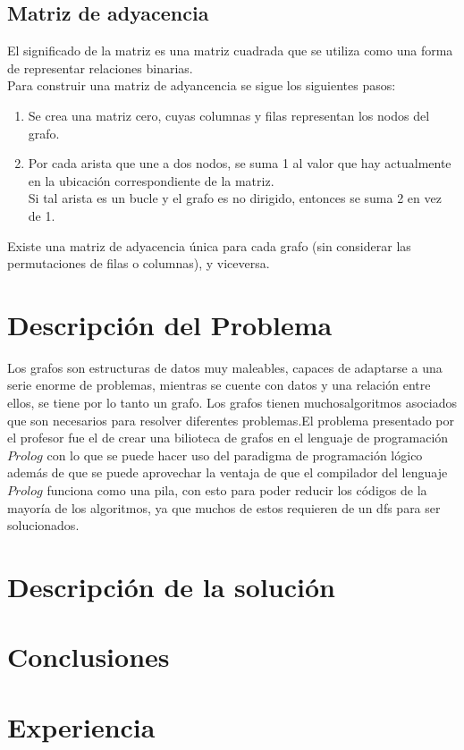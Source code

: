 \documentclass[10pt,a4paper]{article}
\begin{document}
\subsection{Matriz de adyacencia}
El significado de la matriz es una matriz cuadrada que se utiliza como una forma de representar relaciones binarias.\\

Para construir una matriz de adyancencia se sigue los siguientes pasos:
\begin{enumerate}
\item Se crea una matriz cero, cuyas columnas y filas representan los nodos del grafo.
\item Por cada arista que une a dos nodos, se suma 1 al valor que hay actualmente en la ubicación correspondiente de la matriz.\\
	Si tal arista es un bucle y el 			grafo es no dirigido, entonces se 	suma 2 en vez de 1.
\end{enumerate}
Existe una matriz de adyacencia única para cada grafo (sin considerar las permutaciones de filas o columnas), y viceversa.
\cite{Matriz}\\
\pagebreak
\section{Descripción del Problema}
	Los grafos son estructuras de datos muy maleables, capaces de adaptarse a una serie enorme de problemas, mientras se cuente con datos y una relación entre ellos, se tiene por lo tanto un grafo. Los grafos tienen muchosalgoritmos asociados que son necesarios para resolver diferentes problemas.El problema presentado por el profesor fue el de crear una bilioteca de grafos en el lenguaje  de programación $Prolog$ con lo que se puede hacer uso del paradigma de programación lógico además de que se puede aprovechar la ventaja de que el compilador del lenguaje $Prolog$ funciona como una pila, con esto para poder reducir los códigos de la mayoría de los algoritmos, ya que muchos de estos requieren de un dfs para ser solucionados. 
\section{Descripción de la solución}

\pagebreak
\section{Conclusiones}

\section{Experiencia}

\pagebreak


\end{document}
